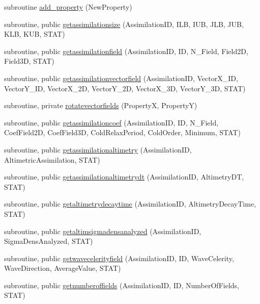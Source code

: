 \begin{DoxyCompactItemize}
subroutine \mbox{\hyperlink{namespacemoduleassimilation_a59854402d2db7e0920208b8293922fc2}{add\+\_\+property}} (New\+Property)
\item 
subroutine, public \mbox{\hyperlink{namespacemoduleassimilation_a9dcf23578dc00d565791f0b2ce1edc7d}{getassimilationsize}} (Assimilation\+ID, I\+LB, I\+UB, J\+LB, J\+UB, K\+LB, K\+UB, S\+T\+AT)
\item 
subroutine, public \mbox{\hyperlink{namespacemoduleassimilation_aa6ac00eae8c819e287924553d8d10638}{getassimilationfield}} (Assimilation\+ID, ID, N\+\_\+\+Field, Field2D, Field3D, S\+T\+AT)
\item 
subroutine, public \mbox{\hyperlink{namespacemoduleassimilation_a3f99df6f8207db00fe69fa4d172335b1}{getassimilationvectorfield}} (Assimilation\+ID, Vector\+X\+\_\+\+ID, Vector\+Y\+\_\+\+ID, Vector\+X\+\_\+2D, Vector\+Y\+\_\+2D, Vector\+X\+\_\+3D, Vector\+Y\+\_\+3D, S\+T\+AT)
\item 
subroutine, private \mbox{\hyperlink{namespacemoduleassimilation_a91d65081df0418d8a1b46cb4548710f3}{rotatevectorfields}} (PropertyX, PropertyY)
\item 
subroutine, public \mbox{\hyperlink{namespacemoduleassimilation_aeb67db12f57e948ab0d21c07cf0f3ee4}{getassimilationcoef}} (Assimilation\+ID, ID, N\+\_\+\+Field, Coef\+Field2D, Coef\+Field3D, Cold\+Relax\+Period, Cold\+Order, Minimum, S\+T\+AT)
\item 
subroutine, public \mbox{\hyperlink{namespacemoduleassimilation_ae8923d911da53170ca8bc79256ecfaee}{getassimilationaltimetry}} (Assimilation\+ID, Altimetric\+Assimilation, S\+T\+AT)
\item 
subroutine, public \mbox{\hyperlink{namespacemoduleassimilation_a4c4fab1da99106327a65575667e03252}{getassimilationaltimetrydt}} (Assimilation\+ID, Altimetry\+DT, S\+T\+AT)
\item 
subroutine, public \mbox{\hyperlink{namespacemoduleassimilation_aaab7e59362629aa1c11d99a2b3b6ad30}{getaltimetrydecaytime}} (Assimilation\+ID, Altimetry\+Decay\+Time, S\+T\+AT)
\item 
subroutine, public \mbox{\hyperlink{namespacemoduleassimilation_a49834c1e597575cf155649b2bfe4321b}{getaltimsigmadensanalyzed}} (Assimilation\+ID, Sigma\+Dens\+Analyzed, S\+T\+AT)
\item 
subroutine, public \mbox{\hyperlink{namespacemoduleassimilation_ae45ed729fac9768fcf97b5c5262c471a}{getwavecelerityfield}} (Assimilation\+ID, ID, Wave\+Celerity, Wave\+Direction, Average\+Value, S\+T\+AT)
\item 
subroutine, public \mbox{\hyperlink{namespacemoduleassimilation_aea7807de0a1c100aea360d7f4a30e2e5}{getnumberoffields}} (Assimilation\+ID, ID, Number\+Of\+Fields, S\+T\+AT)

\end{DoxyCompactItemize}
